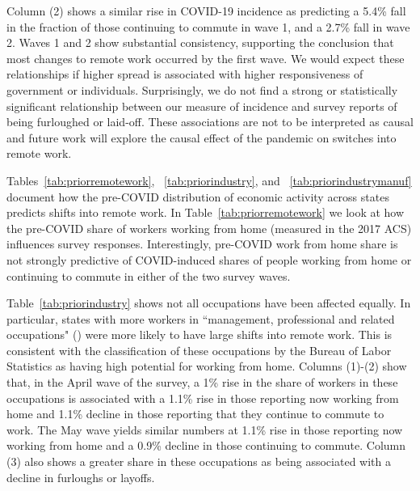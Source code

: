 \documentclass[12pt]{article}
\begin{document}
Column (2) shows a similar rise in COVID-19 incidence as predicting a 5.4\% fall in the fraction of those continuing to commute in wave 1, and a 2.7\% fall in wave 2. Waves 1 and 2 show substantial consistency, supporting the conclusion that most changes to remote work occurred by the first wave. We would expect these relationships if higher spread is associated with higher responsiveness of government or individuals. Surprisingly, we do not find a strong or statistically significant relationship between our measure of incidence and survey reports of being furloughed or laid-off. These associations are not to be interpreted as causal and future work will explore the causal effect of the pandemic on switches into remote work.



Tables~\ref{tab:priorremotework}, ~\ref{tab:priorindustry}, and ~\ref{tab:priorindustrymanuf} document how the pre-COVID distribution of economic activity across states predicts shifts into remote work. In Table~\ref{tab:priorremotework} we look at how the pre-COVID share of workers working from home (measured in the 2017 ACS) influences survey responses.  Interestingly, pre-COVID work from home share is not strongly predictive of COVID-induced shares of people working from home or continuing to commute in either of the two survey waves. 



Table~\ref{tab:priorindustry} shows not all occupations have been affected equally.  In particular, states with more workers in ``management, professional and related occupations" (\cite{krantz2019did}) were more likely to have large shifts into remote work. This is consistent with the classification of these occupations by the Bureau of Labor Statistics as having high potential for working from home. Columns (1)-(2) show that, in the April wave of the survey, a 1\% rise in the share of workers in these occupations is associated with a 1.1\% rise in those reporting now working from home and 1.1\% decline in those reporting that they continue to commute to work. The May wave yields similar numbers at 1.1\% rise in those reporting now working from home and a 0.9\% decline in those continuing to commute. Column (3) also shows a greater share in these occupations as being associated with a decline in furloughs or layoffs. 


\end{document}
